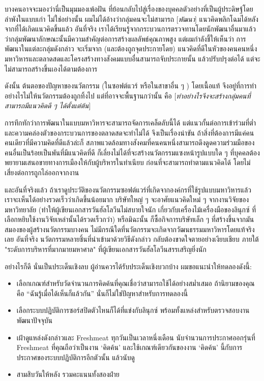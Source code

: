 {บางคนอาจจะมองว่านี่เป็นมุมมองเพ้อฝัน
ที่ย้อนกลับไปสู่เรื่องของบุคคลตัวอย่างที่เป็นผู้ประดิษฐ์โดยลำพังในแบบเก่า
ไม่ใช่อย่างนั้น ผมไม่ได้อ้างว่ากลุ่มคนจะไม่สามารถ {[}\emph{พัฒนา}{]}
แนวคิดพลิกโฉมได้หลังจากที่ได้เกิดแนวคิดขึ้นแล้ว อันที่จริง
เราได้เรียนรู้จากกระบวนการตรวจทานโดยนักพัฒนาอื่นมาแล้ว
ว่ากลุ่มพัฒนาลักษณะนั้นมีความสำคัญต่อการสร้างผลลัพธ์คุณภาพสูง
แต่ผมกำลังชี้ให้เห็นว่า การพัฒนาในแต่ละกลุ่มดังกล่าว จะเริ่มจาก
(และต้องถูกจุดประกายโดย) แนวคิดที่ดีในหัวของคนคนหนึ่ง
มหาวิหารและตลาดสดและโครงสร้างทางสังคมแบบอื่นสามารถจับประกายนั้น
แล้วปรับปรุงต่อได้ แต่จะไม่สามารถสร้างขึ้นเองได้ตามต้องการ

ดังนั้น ต้นตอของปัญหาของนวัตกรรม (ในซอฟต์แวร์ หรือในสาขาอื่น ๆ )
โดยเนื้อแท้ จึงอยู่ที่การทำอย่างไรไม่ให้นวัตกรรมต้องถูกทิ้งไป
แต่ที่อาจจะพื้นฐานกว่านั้น คือ
{[}\emph{ทำอย่างไรจึงจะสร้างกลุ่มคนที่สามารถมีแนวคิดดี ๆ
      ได้ตั้งแต่ต้น}{]}

การทึกทักว่าการพัฒนาในแบบมหาวิหารจะสามารถจัดการเคล็ดลับนี้ได้
แต่แนวกั้นต่อการเข้าร่วมที่ต่ำ
และความคล่องตัวของกระบวนการของตลาดสดจะทำไม่ได้ จึงเป็นเรื่องน่าขัน
ถ้าสิ่งที่ต้องการมีแค่คนคนเดียวที่มีความคิดที่ดีแล้วล่ะก็
สภาพแวดล้อมทางสังคมที่คนคนหนึ่งสามารถดึงดูดความร่วมมือของคนอื่นเป็นร้อยเป็นพันที่มีแนวคิดที่ดี
ก็เลี่ยงไม่ได้ที่จะสร้างนวัตกรรมแซงหน้ารูปแบบใด ๆ
ที่บุคคลต้องพยายามเสนอขายทางการเมืองให้กับผู้บริหารในทำเนียบ
ก่อนที่จะสามารถทำตามแนวคิดได้ โดยไม่เสี่ยงต่อการถูกไล่ออกจากงาน

และอันที่จริงแล้ว
ถ้าเราดูประวัติของนวัตกรรมซอฟต์แวร์ที่เกิดจากองค์กรที่ใช้รูปแบบมหาวิหารแล้ว
เราจะเห็นได้อย่างรวดเร็วว่าเกิดขึ้นน้อยมาก บริษัทใหญ่ ๆ
จะอาศัยแนวคิดใหม่ ๆ  จากงานวิจัยของมหาวิทยาลัย
(ทำให้ผู้เขียนเอกสารวันฮัลโลวีนไม่สบายใจนัก
เกี่ยวกับเครื่องไม้เครื่องมือของลินุกซ์
ที่เลือกหยิบใช้งานวิจัยเหล่านั้นได้รวดเร็วกว่า) หรือมิฉะนั้น
ก็ซื้อกิจการบริษัทเล็ก ๆ  ที่สร้างขึ้นจากมันสมองของผู้สร้างนวัตกรรมบางคน
ไม่มีกรณีใดที่นวัตกรรมจะเกิดจากวัฒนธรรมมหาวิหารโดยแท้จริงเลย อันที่จริง
นวัตกรรมหลายชิ้นที่นำเข้ามาด้วยวิธีดังกล่าว
กลับต้องขาดใจตายอย่างเงียบเชียบ ภายใต้ "ระดับการบริหารที่มากมายมหาศาล"
ที่ผู้เขียนเอกสารวันฮัลโลวีนสรรเสริญยิ่งนัก

อย่างไรก็ดี นั่นเป็นประเด็นเชิงลบ ผู้อ่านควรได้รับประเด็นเชิงบวกบ้าง
ผมขอแนะนำให้ทดลองดังนี้:

\begin{itemize}
      \item
            เลือกเกณฑ์สำหรับวัดจำนวนการคิดค้นที่คุณเชื่อว่าสามารถใช้ได้อย่างสม่ำเสมอ
            ถ้านิยามของคุณคือ ``ฉันรู้เมื่อได้เห็นก็แล้วกัน''
            นั่นก็ไม่ใช่ปัญหาสำหรับการทดลองนี้
      \item
            เลือกระบบปฏิบัติการซอร์สปิดตัวไหนก็ได้ที่แข่งกับลินุกซ์
            พร้อมทั้งแหล่งสำหรับตรวจสอบงานพัฒนาปัจจุบัน
      \item
            เฝ้าดูแหล่งดังกล่าวและ Freshmeat ทุกวันเป็นเวลาหนึ่งเดือน
            นับจำนวนการประกาศออกรุ่นที่ Freshmeat ที่คุณถือว่าเป็นงาน `คิดค้น'
            และใช้เกณฑ์เดียวกันของงาน `คิดค้น'
            นี้กับการประกาศของระบบปฏิบัติการอีกตัวนั้น แล้วนับดู
      \item
            สามสิบวันให้หลัง รวมคะแนนทั้งสองฝ่าย
\end{itemize}

}

